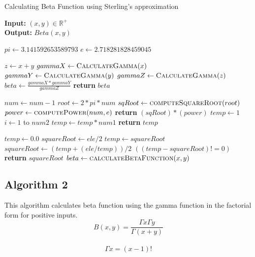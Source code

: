 \documentclass[12pt]{report}
\begin{document}
\begin{algorithm}
\caption{Calculating Beta Function using Sterling's approximation}
\textbf{Input:}  $ (x,y) \in \mathbb{R}^{+}$\\
\textbf{Output:} $ Beta(x,y) $
\begin{algorithmic}[1]
\State $pi \leftarrow 3.141592653589793$
\State $e \leftarrow 2.718281828459045$

    \State $z \leftarrow x+y$
    \State $gammaX  \leftarrow \Call{CalculateGamma}{x}$
    \State $gammaY \leftarrow \Call{CalculateGamma}{y}$
    \State $gammaZ \leftarrow \Call{CalculateGamma}{z}$
    \State $beta \leftarrow \frac{gammaX *gammaY}{gammaZ}$
    \State \textbf{return} $beta$
    \EndProcedure
\Statex


        \State $num \leftarrow num - 1$
        \State $root \leftarrow 2 * pi * num$
        \State $sqRoot\leftarrow \Call {computeSquareRoot}{root}$
        \State $power \leftarrow \Call {computePower}{num,e}$
        \State \textbf{return} $(sqRoot) * (power)$
    \EndProcedure
\Statex
{}
        \State $temp \leftarrow 1$
        \For $ i \leftarrow 1$ to $num2$
        \State $temp \leftarrow temp * num1$
        \EndFor
        \State \textbf{return} $temp$ 
    \EndProcedure
\Statex

        \State $temp \leftarrow 0.0$
        \State $squareRoot \leftarrow ele / 2$
        \Do
        \State $temp \leftarrow squareRoot$
        \State $squareRoot \leftarrow (temp + (ele / temp)) / 2$
        \doWhile $((temp - squareRoot) != 0)$
        \State \textbf{return} $squareRoot $
    \EndProcedure
\Statex
\Statex
\State $beta \leftarrow \Call{calculateBetaFunction}{x,y}$

\end{algorithmic}
\end{algorithm}

\newpage
\subsection{Algorithm 2}
This algorithm calculates beta function using the gamma function in the factorial form for positive inputs.
\newline
$$B(x,y)=\frac{\Gamma x \Gamma y}{\Gamma (x+y)}$$\\
\newline
$$\Gamma x = (x-1)!$$\\
\end{document}
